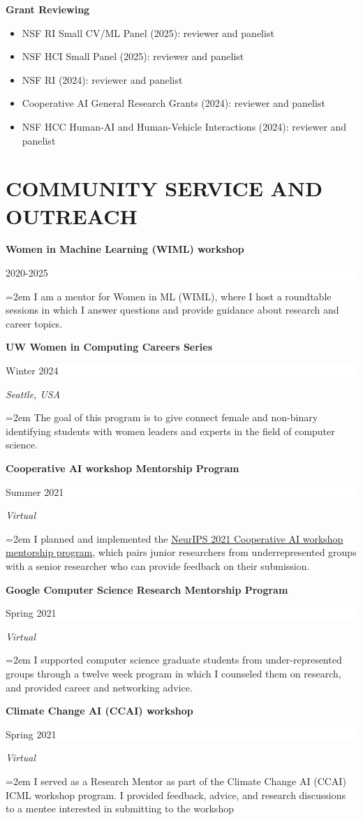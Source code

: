 \documentclass[paper=letter,fontsize=11pt]{scrartcl} %
\newcommand{\sepspace}{\vspace*{1em}}		%
\newcommand{\NewPart}[2]{\section*{\uppercase{#1} #2}}
\newcommand{\EducationEntry}[3]{
		\noindent \textbf{#1} \hfill      %
		\colorbox{White}{%
			\parbox{10em}{%
			\hfill\color{Black}#2}} \par  %
		\noindent \textit{#3} \par}
\newcommand{\ServiceEntry}[4]{
		\noindent \textbf{#1} \hfill      %
		\colorbox{White}{%
			\parbox{10em}{%
			\hfill\color{Black}#2}} \par  %
		\noindent \textit{#3} \par  %
		\noindent\hangindent=2em\hangafter=0 \small #4 %
		\normalsize \par}
\begin{document}
\noindent \textbf{Grant Reviewing}
\begin{itemize}
    \item NSF RI Small CV/ML Panel (2025): reviewer and panelist %
    \item NSF HCI Small Panel (2025): reviewer and panelist %
    \item NSF RI (2024): reviewer and panelist
    \item Cooperative AI General Research Grants (2024): reviewer and panelist
    \item NSF HCC Human-AI and Human-Vehicle Interactions (2024): reviewer and panelist
\end{itemize}

\NewPart{Community Service and outreach}{}




\ServiceEntry{Women in Machine Learning (WIML) workshop}{2020-2025}{}
{I am a mentor for Women in ML (WIML), where I host a roundtable sessions in which I answer questions and provide guidance about research and career topics.}
\sepspace

\ServiceEntry{UW Women in Computing Careers Series}{Winter 2024}{Seattle, USA}
{The goal of this program is to give connect female and non-binary identifying students with women leaders and experts in the field of computer science.}
\sepspace

\ServiceEntry{Cooperative AI workshop Mentorship Program}{Summer 2021}{Virtual}
{I planned and implemented the \href{https://www.cooperativeai.com/neurips-2021/workshop-information#h.ssihuuiopnhu}{NeurIPS 2021 Cooperative AI workshop mentorship program}, which pairs junior researchers from underrepresented groups with a senior researcher who can provide feedback on their submission.}
\sepspace


\ServiceEntry{Google Computer Science Research Mentorship Program}{Spring 2021}{Virtual}
{I supported computer science graduate students from under-represented groups through a twelve week program in which I counseled them on research, and provided career and networking advice.}
\sepspace


\ServiceEntry{Climate Change AI (CCAI) workshop}{Spring 2021}{Virtual}
{I served as a Research Mentor as part of the Climate Change AI (CCAI) ICML workshop program. I provided feedback, advice, and research discussions to a mentee interested in submitting to the workshop}
\sepspace
\end{document}
